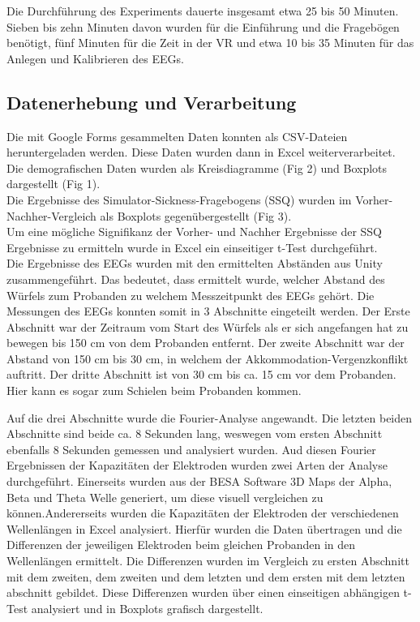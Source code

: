\documentclass[conference]{IEEEtran}
\begin{document}
Die Durchführung des Experiments dauerte insgesamt etwa 25 bis 50 Minuten. Sieben bis zehn Minuten davon wurden für die Einführung und die Fragebögen benötigt, fünf Minuten für die Zeit in der VR und etwa 10 bis 35 Minuten für das Anlegen und Kalibrieren des EEGs. 

\subsection{Datenerhebung und Verarbeitung}
Die mit Google Forms gesammelten Daten konnten als CSV-Dateien heruntergeladen werden. Diese Daten wurden dann in Excel weiterverarbeitet. Die demografischen Daten wurden als Kreisdiagramme (Fig 2) und Boxplots dargestellt (Fig 1).\\
Die Ergebnisse des Simulator-Sickness-Fragebogens (SSQ) wurden im Vorher-Nachher-Vergleich als Boxplots gegenübergestellt (Fig 3).\\
Um eine mögliche Signifikanz der Vorher- und Nachher Ergebnisse der SSQ Ergebnisse zu ermitteln wurde in Excel ein einseitiger t-Test durchgeführt.\\ 
Die Ergebnisse des EEGs wurden mit den ermittelten Abständen aus Unity zusammengeführt. Das bedeutet, dass ermittelt wurde, welcher Abstand des Würfels zum Probanden zu welchem Messzeitpunkt des EEGs gehört. Die Messungen des EEGs konnten somit in 3 Abschnitte eingeteilt werden. Der Erste Abschnitt war der Zeitraum vom Start des Würfels als er sich angefangen hat zu bewegen bis 150 cm von dem Probanden entfernt. Der zweite Abschnitt war der Abstand von 150 cm bis 30 cm, in welchem der Akkommodation-Vergenzkonflikt auftritt. Der dritte Abschnitt ist von 30 cm bis ca. 15 cm vor dem Probanden. Hier kann es sogar zum Schielen beim Probanden kommen.

Auf die drei Abschnitte wurde die Fourier-Analyse angewandt. Die letzten beiden Abschnitte sind beide ca. 8 Sekunden lang, weswegen vom ersten Abschnitt ebenfalls 8 Sekunden gemessen und analysiert wurden.
Aud diesen Fourier Ergebnissen der Kapazitäten der Elektroden wurden zwei Arten der Analyse durchgeführt. Einerseits wurden aus der BESA Software 3D Maps der Alpha, Beta und Theta Welle generiert, um diese visuell vergleichen zu können.Andererseits wurden die Kapazitäten der Elektroden der verschiedenen Wellenlängen in Excel analysiert. Hierfür wurden die Daten übertragen und die Differenzen der jeweiligen Elektroden beim gleichen Probanden in den Wellenlängen ermittelt. Die Differenzen wurden im Vergleich zu ersten Abschnitt mit dem zweiten, dem zweiten und dem letzten und dem ersten mit dem letzten abschnitt gebildet. Diese Differenzen wurden über einen einseitigen abhängigen t-Test analysiert und in Boxplots grafisch dargestellt.
\end{document}
